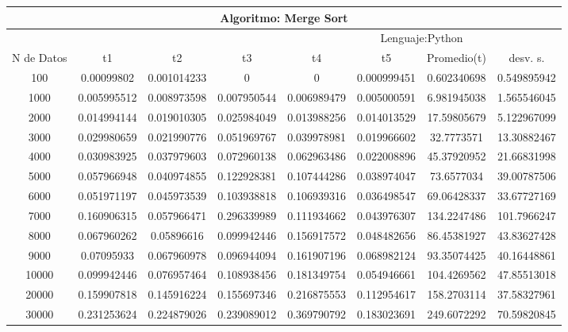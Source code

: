 \documentclass{article}
\begin{document}
                    \begin{table}[]
        \begin{tabular}{|c|c|c|c|c|c|c|c| }
            \hline
            \multicolumn{8}{|c|}{Algoritmo: Merge Sort} \\ \hline
            \multicolumn{4}{|c|}{} & \multicolumn{4}{c|}{Lenguaje:Python} \\ \hline
              N de Datos &     t1    &  t2         &  t3          &   t4        &    t5     &   Promedio(t)       & desv. s. \\ \hline
                100 &	0.00099802	 &0.001014233	 &0 &	0 &	0.000999451 &	0.602340698	 &0.549895942\\ \hline
                1000 &	0.005995512 &	0.008973598 &	0.007950544 &	0.006989479 &	0.005000591 &	6.981945038	 &1.565546045\\ \hline
                2000 &	0.014994144	 &0.019010305 &	0.025984049 &	0.013988256 &	0.014013529	 &17.59805679	 &5.122967099\\ \hline
                3000 &	0.029980659 &	0.021990776 &	0.051969767 &	0.039978981 &	0.019966602 &	32.7773571	 &13.30882467\\ \hline
                4000	 &0.030983925 &	0.037979603 &	0.072960138 &	0.062963486 &	0.022008896 &	45.37920952	 &21.66831998\\ \hline
                5000 &	0.057966948	 &0.040974855 &	0.122928381 &	0.107444286 &	0.038974047 &	73.6577034	 &39.00787506\\ \hline
                6000 &	0.051971197 &	0.045973539 &	0.103938818 &	0.106939316 &	0.036498547 &	69.06428337	 &33.67727169\\ \hline
                7000 &	0.160906315 &	0.057966471 &	0.296339989 &	0.111934662 &	0.043976307 &	134.2247486	 &101.7966247\\ \hline
                8000 &	0.067960262 &	0.05896616 &	0.099942446 &	0.156917572 &	0.048482656 &	86.45381927 &	43.83627428\\ \hline
                9000 &	0.07095933	 &0.067960978 &	0.096944094 &	0.161907196 &	0.068982124 &	93.35074425 &	40.16448861\\ \hline
                10000 &	0.099942446 &	0.076957464 &	0.108938456 &	0.181349754 &	0.054946661	 &104.4269562	 &47.85513018\\ \hline
                20000 &	0.159907818 &	0.145916224 &	0.155697346 &	0.216875553 &	0.112954617	 &158.2703114	 &37.58327961\\ \hline
                30000 &	0.231253624 &	0.224879026 &	0.239089012 &	0.369790792 &	0.183023691	 &249.6072292 &	70.59820845\\ \hline

\end{tabular}
\end{table}
\end{document}
